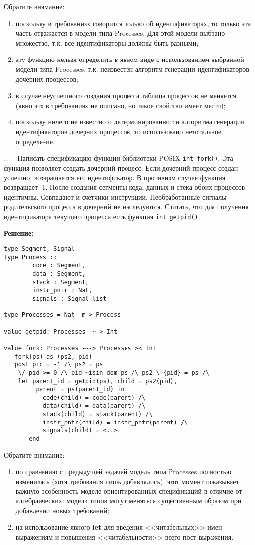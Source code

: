 \documentclass[14pt, twoside]{extreport}
\newcounter{problem_type}[chapter]
\newcounter{zadacha}[problem_type]
\newcommand{\z}{\vspace{0.5cm}\par\addtocounter{zadacha}{1}%
\textit{\arabic{chapter}.\arabic{problem_type}.\arabic{zadacha}}~~  }
\begin{document}
Обратите внимание:
\begin{enumerate}
  \item поскольку в требованиях говорится только об идентификаторах, то только эта часть отражается в модели типа Processes. Для этой модели выбрано множество, т.к. все идентификаторы должны быть разными;
  \item эту функцию нельзя определить в явном виде с использованием выбранной модели типа Processes, т.к. неизвестен алгоритм генерации идентификаторов дочерних процессов;
  \item в случае неуспешного создания процесса таблица процессов не меняется (явно это в требованиях не описано, но такое свойство имеет место);
  \item поскольку ничего не известно о детерминированности алгоритма генерации идентификаторов дочерних процессов, то использовано нетотальное определение.
\end{enumerate}

\z Написать спецификацию функции библиотеки POSIX \texttt{int fork()}. Эта функция позволяет создать дочерний процесс. Если дочерний процесс создан успешно, возвращается его идентификатор. В противном случае функция возвращает -1. После создания сегменты кода, данных и стека обоих процессов идентичны. Совпадают и счетчики инструкции. Необработанные сигналы родительского процесса в дочерний не наследуются. Считать, что для получения идентификатора текущего процесса есть функция \texttt{int getpid()}.

\textbf{Решение:}
\begin{lstlisting}
type Segment, Signal
type Process ::
		code : Segment,
		data : Segment,
		stack : Segment,
		instr_pntr : Nat,
		signals : Signal-list

type Processes = Nat -m-> Process

value getpid: Processes -~-> Int

value fork: Processes -~-> Processes >< Int
   fork(ps) as (ps2, pid)
   post pid = -1 /\ ps2 = ps
   	\/ pid >= 0 /\ pid ~isin dom ps /\ ps2 \ {pid} = ps /\
	let parent_id = getpid(ps), child = ps2(pid),
	     parent = ps(parent_id) in
   	       code(child) = code(parent) /\
   	       data(child) = data(parent) /\
   	       stack(child) = stack(parent) /\
   	       instr_pntr(child) = instr_pntr(parent) /\
   	       signals(child) = <..>
   	   end
\end{lstlisting}

Обратите внимание:
\begin{enumerate}
  \item по сравнению с предыдущей задачей модель типа Processes полностью изменилась (хотя требования лишь добавлялись), этот момент показывает важную особенность моделе-ориентированных спецификаций в отличие от алгебраических: модели типов могут меняться существенным образом при добавлении новых требований;
  \item на использование явного \textbf{let} для введения <<читабельных>> имен выражениям и повышения <<читабельности>> всего пост-выражения.
\end{enumerate}
\end{document}
